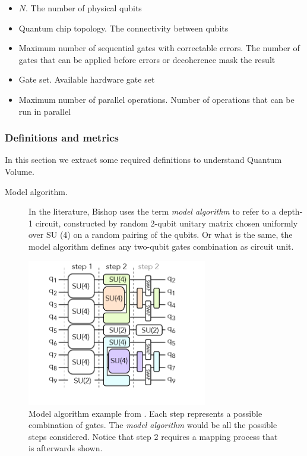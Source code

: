 \documentclass[11pt]{article}
\begin{document}
\begin{itemize}
\item \(N\). The number of physical qubits
\item Quantum chip topology. The connectivity between qubits
\item Maximum number of sequential gates with correctable errors. The number of gates that can be applied before errors or decoherence mask the result
\item Gate set. Available hardware gate set
\item Maximum number of parallel operations. Number of operations that can be run in parallel
\end{itemize}

\subsubsection{Definitions and metrics}
\label{sec:orgf1f1fca}

In this section we extract some required definitions \cite{Bishop_2017,Moll_2018} to understand Quantum Volume.


\begin{description}
\item[{Model algorithm.}] In the literature, Bishop uses the term \emph{model algorithm} \cite{Bishop_2017} to refer to a depth-1 circuit, constructed by random 2-qubit unitary matrix chosen uniformly over SU (4) on a random pairing of the qubits. Or what is the same, the model algorithm defines any two-qubit gates combination as circuit unit.
\end{description}

\begin{figure}[htbp]
\centering
\includegraphics[width=0.7\textwidth]{model_algorithm.png}
\caption{\label{fig:org0b76ad2}
Model algorithm example from \cite{Moll_2018}. Each step represents a possible combination of gates. The \emph{model algorithm} would be all the possible steps considered. Notice that step 2 requires a mapping process that is afterwards shown.}
\end{figure}
\end{document}
